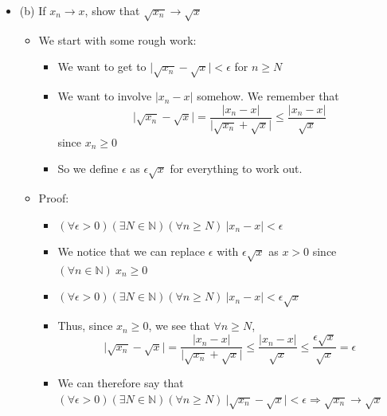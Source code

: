 \documentclass{article}
\begin{document}
\begin{itemize}
\begin{itemize}
\begin{itemize}
            \item Then $(\forall n \ge N) \ \vert \sqrt{x_n} - 0 \vert = \sqrt{x_n} < \sqrt{\epsilon^2} = \epsilon.$
            \item We conclude $(\forall \epsilon > 0)(\exists N \in \mathbb{N})(\forall n \ge N) \ \vert \sqrt{x_n} - 0 \vert < \epsilon \Rightarrow \sqrt{a_n} \rightarrow 0$
        \end{itemize}
        \item (b) If $x_n \rightarrow x$, show that $\sqrt{x_n} \rightarrow \sqrt{x}$
        \begin{itemize}
            \item We start with some rough work:
            \begin{itemize}
                \item We want to get to $\vert \sqrt{x_n} - \sqrt{x} \vert < \epsilon$ for $n \ge N$
                \item We want to involve $\vert x_n - x \vert$ somehow. We remember that
                \[
                \vert \sqrt{x_n} - \sqrt{x} \vert = \frac{\vert x_n - x \vert}{\vert \sqrt{x_n} + \sqrt{x} \vert} \le \frac{\vert x_n - x \vert}{\sqrt{x}}
                \]
                since $x_n \ge 0$
                \item So we define $\epsilon$ as $\epsilon \sqrt{x}$ for everything to work out.
            \end{itemize}
            \item Proof:
            \begin{itemize}
                \item $(\forall \epsilon > 0)(\exists N \in \mathbb{N})(\forall n \ge N) \ \vert x_n - x \vert < \epsilon$
                \item We notice that we can replace $\epsilon$ with $\epsilon \sqrt{x}$ as $x > 0$ since $(\forall n \in \mathbb{N}) \ x_n \ge 0$
                \item $(\forall \epsilon > 0)(\exists N \in \mathbb{N})(\forall n \ge N) \ \vert x_n - x \vert < \epsilon \sqrt{x}$
                \item Thus, since $x_n \ge 0$, we see that $\forall n \ge N$,
                \[
                \vert \sqrt{x_n} - \sqrt{x} \vert = \frac{\vert x_n - x \vert}{\vert \sqrt{x_n} + \sqrt{x} \vert} \le \frac{\vert x_n - x \vert}{\sqrt{x}} \le \frac{\epsilon\sqrt{x}}{\sqrt{x}} = \epsilon
                \]
                \item We can therefore say that $(\forall \epsilon > 0)(\exists N \in \mathbb{N})(\forall n \ge N) \ \vert \sqrt{x_n} - \sqrt{x} \vert < \epsilon \Rightarrow \sqrt{x_n} \rightarrow \sqrt{x}$

\end{itemize}
\end{itemize}
\end{itemize}
\end{itemize}
\end{document}
